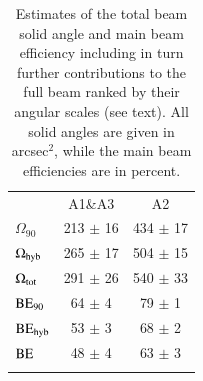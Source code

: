 %
\begin{table}[!h]
\caption{Estimates of the total beam solid angle and main beam
efficiency including in turn further contributions to the full beam ranked by
their angular scales (see text). All solid angles are given in arcsec$^{2}$,
while the main beam efficiencies are in percent.}
\label{tab:solid_corr}
\centering
\begin{tabular}{lcc}
\hline\hline
\noalign{\smallskip}
&  A1\&A3 & A2 \\
\noalign{\smallskip}
\hline
\noalign{\smallskip}
$\Omega_{90}$        &    213 $\pm$  16 & 434 $\pm$ 17 \\\noalign{\smallskip}
$\Omega_{\rm{hyb}}$   &    265 $\pm$  17 & 504 $\pm$ 15  \\\noalign{\smallskip}
$\Omega_{\rm{tot}}$   &    291 $\pm$  26 & 540 $\pm$ 33  \\\noalign{\smallskip}
\noalign{\smallskip}
\hline
\noalign{\smallskip}
$\rm{BE}_{90}$       &   64 $\pm$  4 &  79 $\pm$ 1  \\\noalign{\smallskip}
$\rm{BE}_{\rm{hyb}}$  &   53 $\pm$ 3 &   68 $\pm$ 2  \\\noalign{\smallskip}
$\rm{BE}$            &   48 $\pm$ 4  &  63 $\pm$ 3  \\\noalign{\smallskip}
\noalign{\smallskip}
\hline
\end{tabular}
\end{table}
%

